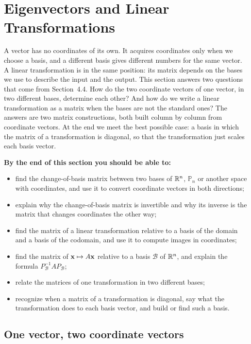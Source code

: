 \documentclass[11pt]{article}
\begin{document}
\section{Eigenvectors and Linear Transformations}

\begin{guide}
A vector has no coordinates of its own. It acquires coordinates only when we choose a basis, and a different basis gives different numbers for the same vector. A linear transformation is in the same position: its matrix depends on the bases we use to describe the input and the output. This section answers two questions that come from Section~4.4. How do the two coordinate vectors of one vector, in two different bases, determine each other? And how do we write a linear transformation as a matrix when the bases are not the standard ones? The answers are two matrix constructions, both built column by column from coordinate vectors. At the end we meet the best possible case: a basis in which the matrix of a transformation is diagonal, so that the transformation just scales each basis vector.
\end{guide}

\textbf{By the end of this section you should be able to:}
\begin{itemize}
  \item find the change-of-basis matrix between two bases of $\mathbb{R}^n$, $\mathbb{P}_n$ or another space with coordinates, and use it to convert coordinate vectors in both directions;
  \item explain why the change-of-basis matrix is invertible and why its inverse is the matrix that changes coordinates the other way;
  \item find the matrix of a linear transformation relative to a basis of the domain and a basis of the codomain, and use it to compute images in coordinates;
  \item find the matrix of $\mathbf{x}\mapsto A\mathbf{x}$ relative to a basis $\mathcal{B}$ of $\mathbb{R}^n$, and explain the formula $P_{\mathcal{B}}^{-1}AP_{\mathcal{B}}$;
  \item relate the matrices of one transformation in two different bases;
  \item recognize when a matrix of a transformation is diagonal, say what the transformation does to each basis vector, and build or find such a basis.
\end{itemize}

\subsection*{One vector, two coordinate vectors}
\end{document}
